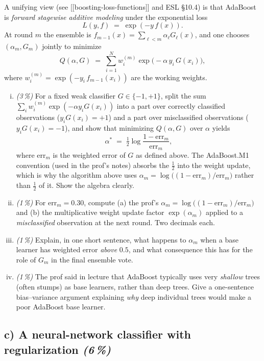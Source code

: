 \documentclass[11pt,a4paper]{article}
\newcommand{\subpoints}[1]{\textit{(#1\,\%)}}
\begin{document}
A unifying view (see [[boosting-loss-functions]] and ESL §10.4) is that AdaBoost is \emph{forward stagewise additive modeling} under the exponential loss
$$L(y, f) \;=\; \exp(-y\,f(x)).$$
At round $m$ the ensemble is $f_{m-1}(x) = \sum_{\ell < m} \alpha_\ell G_\ell(x)$, and one chooses $(\alpha_m, G_m)$ jointly to minimize
$$Q(\alpha, G) \;=\; \sum_{i=1}^N w_i^{(m)} \exp\!\bigl(-\alpha\, y_i\, G(x_i)\bigr),$$
where $w_i^{(m)} = \exp(-y_i\, f_{m-1}(x_i))$ are the working weights.

\begin{enumerate}[(i)]
  \item \subpoints{3} For a fixed weak classifier $G \in \{-1,+1\}$, split the sum $\sum_i w_i^{(m)} \exp(-\alpha y_i G(x_i))$ into a part over correctly classified observations ($y_i G(x_i) = +1$) and a part over misclassified observations ($y_i G(x_i) = -1$), and show that minimizing $Q(\alpha, G)$ over $\alpha$ yields
  $$\alpha^* \;=\; \tfrac{1}{2} \log \frac{1 - \mathrm{err}_m}{\mathrm{err}_m},$$
  where $\mathrm{err}_m$ is the weighted error of $G$ as defined above. The AdaBoost.M1 convention (used in the prof's notes) absorbs the $\tfrac{1}{2}$ into the weight update, which is why the algorithm above uses $\alpha_m = \log\bigl((1-\mathrm{err}_m)/\mathrm{err}_m\bigr)$ rather than $\tfrac{1}{2}$ of it. Show the algebra clearly.

  \item \subpoints{1} For $\mathrm{err}_m = 0.30$, compute (a) the prof's $\alpha_m = \log\bigl((1-\mathrm{err}_m)/\mathrm{err}_m\bigr)$ and (b) the multiplicative weight update factor $\exp(\alpha_m)$ applied to a \emph{misclassified} observation at the next round. Two decimals each.

  \item \subpoints{1} Explain, in one short sentence, what happens to $\alpha_m$ when a base learner has weighted error \emph{above} $0.5$, and what consequence this has for the role of $G_m$ in the final ensemble vote.

  \item \subpoints{1} The prof said in lecture that AdaBoost typically uses very \emph{shallow} trees (often stumps) as base learners, rather than deep trees. Give a one-sentence bias--variance argument explaining \emph{why} deep individual trees would make a poor AdaBoost base learner.
\end{enumerate}

\subsection*{c) A neural-network classifier with regularization \subpoints{6}}
\end{document}
